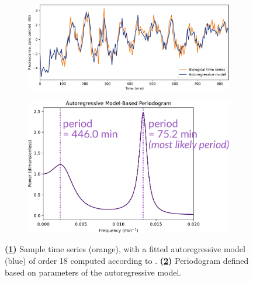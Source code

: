 \begin{figure}
  \centering
  \begin{subfigure}[htpb]{0.6\textwidth}
   \centering
   \includegraphics[width=\textwidth]{timeseries_example_for_ar_edit}
   \caption{
   }
   \label{fig:analysis-ar-timeseries}
  \end{subfigure}%
  \begin{subfigure}[htpb]{0.4\textwidth}
   \centering
   \includegraphics[width=\textwidth]{ar}
   \caption{
   }
   \label{fig:analysis-ar-periodogram}
  \end{subfigure}

  \caption[
    Sample time series, with a fitted autoregressive model computed according to \textcite{jiaFrequencyDomainAnalysis2020}.
  ]{
    \textbf{(\ref{fig:analysis-ar-timeseries})}
    Sample time series (orange), with a fitted autoregressive model (blue) of order 18 computed according to \textcite{jiaFrequencyDomainAnalysis2020}.
    \textbf{(\ref{fig:analysis-ar-periodogram})}
    Periodogram defined based on parameters of the autoregressive model.
  }
  \label{fig:analysis-ar}
\end{figure}


